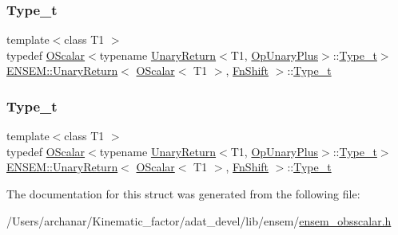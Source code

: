 \subsubsection{\texorpdfstring{Type\_t}{Type\_t}\hspace{0.1cm}{\footnotesize\ttfamily [1/2]}}
{\footnotesize\ttfamily template$<$class T1 $>$ \\
typedef \mbox{\hyperlink{classENSEM_1_1OScalar}{O\+Scalar}}$<$typename \mbox{\hyperlink{structENSEM_1_1UnaryReturn}{Unary\+Return}}$<$T1, \mbox{\hyperlink{structENSEM_1_1OpUnaryPlus}{Op\+Unary\+Plus}}$>$\+::\mbox{\hyperlink{structENSEM_1_1UnaryReturn_3_01OScalar_3_01T1_01_4_00_01FnShift_01_4_a800574635cdc9328aeda8a2f34cd559d}{Type\+\_\+t}}$>$ \mbox{\hyperlink{structENSEM_1_1UnaryReturn}{E\+N\+S\+E\+M\+::\+Unary\+Return}}$<$ \mbox{\hyperlink{classENSEM_1_1OScalar}{O\+Scalar}}$<$ T1 $>$, \mbox{\hyperlink{structENSEM_1_1FnShift}{Fn\+Shift}} $>$\+::\mbox{\hyperlink{structENSEM_1_1UnaryReturn_3_01OScalar_3_01T1_01_4_00_01FnShift_01_4_a800574635cdc9328aeda8a2f34cd559d}{Type\+\_\+t}}}

\mbox{\label{structENSEM_1_1UnaryReturn_3_01OScalar_3_01T1_01_4_00_01FnShift_01_4_a800574635cdc9328aeda8a2f34cd559d}} 
\subsubsection{\texorpdfstring{Type\_t}{Type\_t}\hspace{0.1cm}{\footnotesize\ttfamily [2/2]}}
{\footnotesize\ttfamily template$<$class T1 $>$ \\
typedef \mbox{\hyperlink{classENSEM_1_1OScalar}{O\+Scalar}}$<$typename \mbox{\hyperlink{structENSEM_1_1UnaryReturn}{Unary\+Return}}$<$T1, \mbox{\hyperlink{structENSEM_1_1OpUnaryPlus}{Op\+Unary\+Plus}}$>$\+::\mbox{\hyperlink{structENSEM_1_1UnaryReturn_3_01OScalar_3_01T1_01_4_00_01FnShift_01_4_a800574635cdc9328aeda8a2f34cd559d}{Type\+\_\+t}}$>$ \mbox{\hyperlink{structENSEM_1_1UnaryReturn}{E\+N\+S\+E\+M\+::\+Unary\+Return}}$<$ \mbox{\hyperlink{classENSEM_1_1OScalar}{O\+Scalar}}$<$ T1 $>$, \mbox{\hyperlink{structENSEM_1_1FnShift}{Fn\+Shift}} $>$\+::\mbox{\hyperlink{structENSEM_1_1UnaryReturn_3_01OScalar_3_01T1_01_4_00_01FnShift_01_4_a800574635cdc9328aeda8a2f34cd559d}{Type\+\_\+t}}}



The documentation for this struct was generated from the following file\+:\begin{DoxyCompactItemize}
\item 
/\+Users/archanar/\+Kinematic\+\_\+factor/adat\+\_\+devel/lib/ensem/\mbox{\hyperlink{lib_2ensem_2ensem__obsscalar_8h}{ensem\+\_\+obsscalar.\+h}}\end{DoxyCompactItemize}
